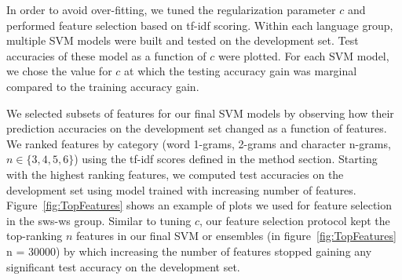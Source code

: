 \documentclass{article}
\begin{document}
In order to avoid over-fitting, we tuned the regularization parameter $c$ and performed feature selection based on tf-idf scoring. Within each language group, multiple SVM models were built and tested on the development set. Test accuracies of these model as a function of $c$ were plotted. For each SVM model, we chose the value for $c$ at which the testing accuracy gain was marginal compared to the training accuracy gain.


We selected subsets of features for our final SVM models by observing how their prediction accuracies on the development set changed as a function of features. We ranked features by category (word 1-grams, 2-grams and character n-grams, $n \in \{3,4,5,6\}$) using the tf-idf scores defined in the method section. Starting with the highest ranking features, we computed test accuracies on the development set using model trained with increasing number of features. Figure~\ref{fig:TopFeatures} shows an example of plots we used for feature selection in the sws-ws group. Similar to tuning $c$, our feature selection protocol kept the top-ranking $n$ features in our final SVM or ensembles (in figure~\ref{fig:TopFeatures} n = 30000) by which increasing the number of features stopped gaining any significant test accuracy on the development set. 
\end{document}
